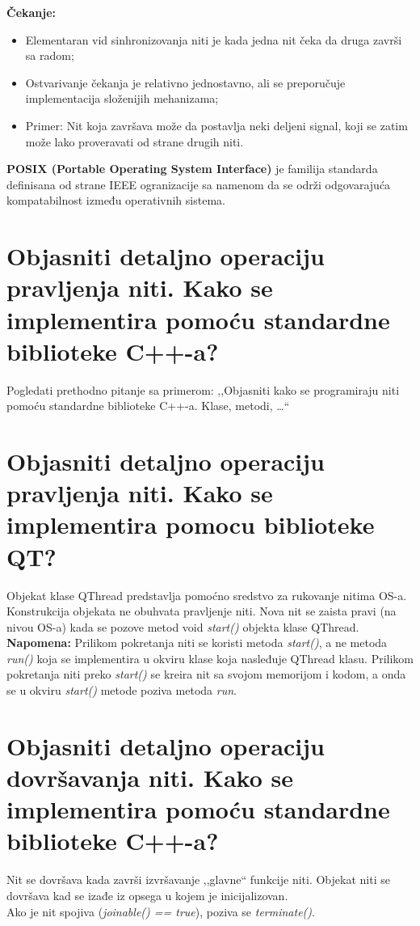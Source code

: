 \documentclass[a4paper]{article}
\begin{document}
  \textbf{Čekanje:}
    \begin{itemize}  
      \item Elementaran vid sinhronizovanja niti je kada jedna nit čeka da druga završi sa radom;
      \item Ostvarivanje čekanja je relativno jednostavno, ali se preporučuje implementacija 
            složenijih mehanizama;
      \item Primer: Nit koja završava može da postavlja neki deljeni signal, koji se zatim može 
            lako proveravati od strane drugih niti.
    \end{itemize}
    \textbf{POSIX (Portable Operating System Interface)} je familija standarda definisana od strane
    IEEE ogranizacije sa namenom da se održi odgovarajuća kompatabilnost između operativnih sistema.

\section{Objasniti detaljno operaciju pravljenja niti. Kako se implementira pomoću 
         standardne biblioteke C++-a?}
  Pogledati prethodno pitanje sa primerom: 
  ,,Objasniti kako se programiraju niti pomoću standardne biblioteke C++-a. Klase, metodi, \dots``

\section{Objasniti detaljno operaciju pravljenja niti. 
         Kako se implementira pomocu biblioteke QT?}
  Objekat klase QThread predstavlja pomoćno sredstvo za rukovanje nitima OS-a. 
  Konstrukcija objekata ne obuhvata pravljenje niti. Nova nit se zaista pravi (na nivou OS-a) 
  kada se pozove metod void \textit{start()} objekta klase QThread.\\

  \textbf{Napomena:} Prilikom pokretanja niti se koristi metoda \textit{start()}, a ne 
  metoda \textit{run()} koja se implementira u okviru klase koja nasleđuje QThread klasu.
  Prilikom pokretanja niti preko \textit{start()} se kreira nit sa svojom memorijom i kodom, a onda se 
  u okviru \textit{start()} metode poziva metoda \textit{run}.
  
\section{Objasniti detaljno operaciju dovršavanja niti. Kako se implementira pomoću standardne
         biblioteke C++-a?}
  Nit se dovršava kada završi izvršavanje ,,glavne`` funkcije niti. Objekat niti se dovršava kad se 
  izađe iz opsega u kojem je inicijalizovan. \\
  \indent Ako je nit spojiva (\textit{joinable() == true}), poziva se \textit{terminate()}.
  \cite{cppref_threaddestructor}
\end{document}
